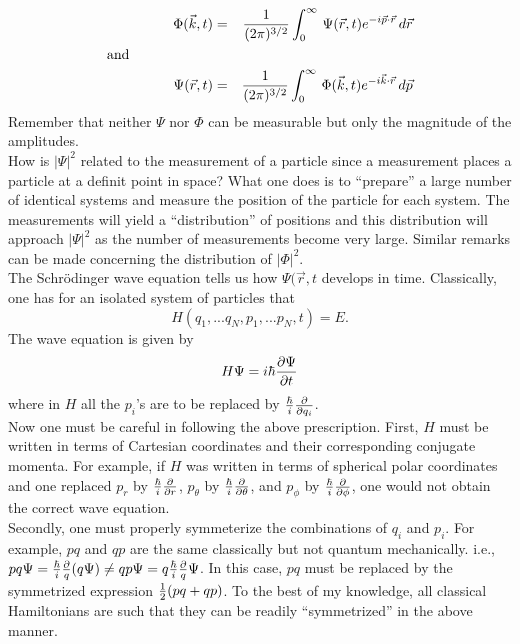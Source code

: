  \begin{eqnarray*}
  \Phi(\vec{k},t) &=& {1\over (2\pi)^{3/2}} \int_0^\infty \, \Psi(\vec{r},t)e^{-i\vec{p}\cdot\vec{r}}\, d\vec{r} \\ 
  \hbox{and~~~~~~~~~~~~~~~~~~\hfill} &\null&\\
  \Psi(\vec{r},t) &=& {1\over (2\pi)^{3/2}} \int_0^\infty \, \Phi(\vec{k},t)e^{-i\vec{k}\cdot\vec{r}}\, d\vec{p} 
 \end{eqnarray*}Remember that neither $\Psi$ nor $\Phi$ can be measurable but only the magnitude of the amplitudes.\\
 
 How is $|\Psi|^2$ related to the measurement of a particle since a measurement places a particle at a definit point in space? What one does is to 
 ``prepare'' a large number of identical systems and measure the position of the particle for each system. The measurements will yield a ``distribution'' of
 positions and this distribution will approach $|\Psi|^2$ as the number of measurements become very large. Similar remarks can be made concerning
 the distribution of $|\Phi|^2$. \\
 
 The Schr\"odinger wave equation tells us how $\Psi(\vec{r},t$ develops in time. Classically, one has for an isolated system of particles that 
 $$H(q_1,...q_N,p_1,...p_N,t) = E.$$ The wave equation is given by $$H\Psi = i\hbar{\partial \Psi\over \partial t}$$ where in $H$ all the $p_i$'s are to be
 replaced by ${\hbar\over i}{\partial\over \partial q_i}$.\\
 
 Now one must be careful in following the above prescription. First, $H$ must be written in terms of Cartesian coordinates and their corresponding conjugate
 momenta. For example, if $H$ was written in terms of spherical polar coordinates and one replaced $p_r$ by ${\hbar\over i}{\partial \over \partial r}$, $p_\theta$ by 
 ${\hbar\over i}{\partial \over \partial\theta}$, and $p_\phi$ by ${\hbar\over i}{\partial\over \partial \phi}$, one would not obtain the correct wave equation.\\
 
 Secondly, one must properly symmeterize the combinations of $q_i$ and $p_i$. For example, $pq$ and $qp$ are the same classically but not quantum mechanically.
 i.e., $pq\Psi = {\hbar\over i} {\partial\over q} (q\Psi) \ne qp \Psi = q {\hbar\over i} {\partial\over q} \Psi$. In this case, $pq$ must be replaced by the symmetrized expression
 ${1\over2}(pq + qp)$. To the best of my knowledge, all classical Hamiltonians are such that they can be readily ``symmetrized'' in the above manner. \\
 
